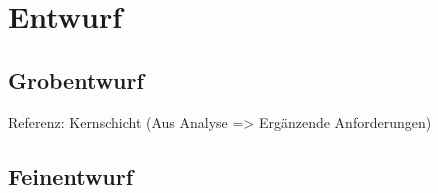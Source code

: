 \section{Entwurf}

\subsection{Grobentwurf}

Referenz: Kernschicht (Aus Analyse => Ergänzende Anforderungen)

\subsection{Feinentwurf}